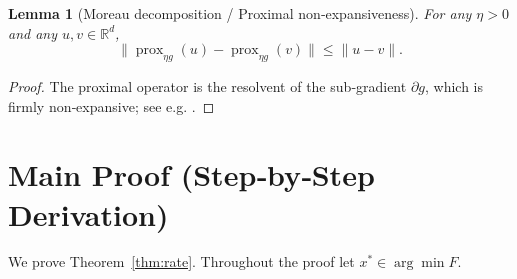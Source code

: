 \documentclass{article}
\newtheorem{lemma}{Lemma}
\newcommand{\prox}{\operatorname{prox}}
\newcommand{\R}{\mathbb{R}}
\begin{document}
\begin{lemma}[Moreau decomposition / Proximal non‑expansiveness]\label{lem:nonexp}
For any $\eta>0$ and any $u,v\in\R^{d}$,
\[
\|\prox_{\eta g}(u)-\prox_{\eta g}(v)\|\le\|u-v\|.
\tag{L2}
\]
\end{lemma}
\begin{proof}
The proximal operator is the resolvent of the sub‑gradient $\partial g$, which is firmly non‑expansive; see e.g. \cite{rockafellar}. \qedhere
\end{proof}

\section*{Main Proof (Step‑by‑Step Derivation)}
We prove Theorem~\ref{thm:rate}. Throughout the proof let $x^{*}\in\arg\min F$.
\end{document}

